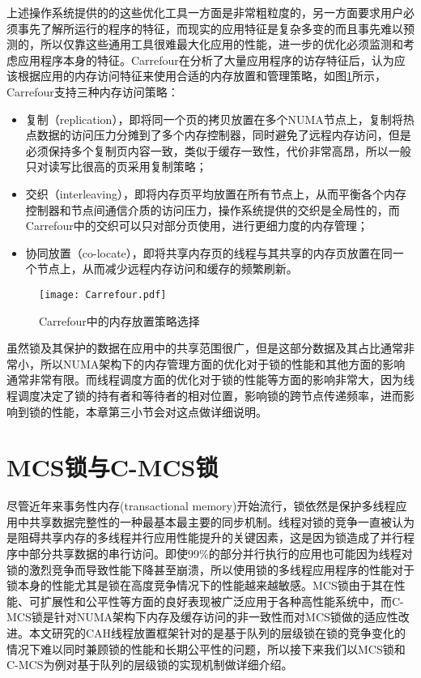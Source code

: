 上述操作系统提供的的这些优化工具一方面是非常粗粒度的，另一方面要求用户必须事先了解所运行的程序的特征，而现实的应用特征是复杂多变的而且事先难以预测的，所以仅靠这些通用工具很难最大化应用的性能，进一步的优化必须监测和考虑应用程序本身的特征。Carrefour\cite{dashti2013traffic}在分析了大量应用程序的访存特征后，认为应该根据应用的内存访问特征来使用合适的内存放置和管理策略，如图\ref{Fig:carrefour}所示，Carrefour支持三种内存访问策略：
\begin{itemize}
\item


复制（replication），即将同一个页的拷贝放置在多个NUMA节点上，复制将热点数据的访问压力分摊到了多个内存控制器，同时避免了远程内存访问，但是必须保持多个复制页内容一致，类似于缓存一致性，代价非常高昂，所以一般只对读写比很高的页采用复制策略；
\item  交织（interleaving），即将内存页平均放置在所有节点上，从而平衡各个内存控制器和节点间通信介质的访问压力，操作系统提供的交织是全局性的，而Carrefour中的交织可以只对部分页使用，进行更细力度的内存管理；
\item 协同放置（co-locate），即将共享内存页的线程与其共享的内存页放置在同一个节点上，从而减少远程内存访问和缓存的频繁刷新。
\end{itemize}

\begin{figure}[t]
	\centering
	\texttt{[image: Carrefour.pdf]}
	\caption{Carrefour中的内存放置策略选择}
	\label{Fig:carrefour}
\end{figure}

虽然锁及其保护的数据在应用中的共享范围很广，但是这部分数据及其占比通常非常小，所以NUMA架构下的内存管理方面的优化对于锁的性能和其他方面的影响通常非常有限。而线程调度方面的优化对于锁的性能等方面的影响非常大，因为线程调度决定了锁的持有者和等待者的相对位置，影响锁的跨节点传递频率，进而影响到锁的性能，本章第三小节会对这点做详细说明。

\section{MCS锁与C-MCS锁}
尽管近年来事务性内存(transactional memory)\cite{larus2008transactional}开始流行，锁依然是保护多线程应用中共享数据完整性的一种最基本最主要的同步机制\cite{tallent2010analyzing}。线程对锁的竞争一直被认为是阻碍共享内存的多线程并行应用性能提升的关键因素，这是因为锁造成了并行程序中部分共享数据的串行访问\cite{tallent2010analyzing}。即使99\%的部分并行执行的应用也可能因为线程对锁的激烈竞争而导致性能下降甚至崩溃，所以使用锁的多线程应用程序的性能对于锁本身的性能尤其是锁在高度竞争情况下的性能越来越敏感\cite{johnson2010decoupling}。MCS锁由于其在性能、可扩展性和公平性等方面的良好表现被广泛应用于各种高性能系统中，而C-MCS锁是针对NUMA架构下内存及缓存访问的非一致性而对MCS锁做的适应性改进。本文研究的CAH线程放置框架针对的是基于队列的层级锁在锁的竞争变化的情况下难以同时兼顾锁的性能和长期公平性的问题，所以接下来我们以MCS锁和C-MCS为例对基于队列的层级锁的实现机制做详细介绍。

